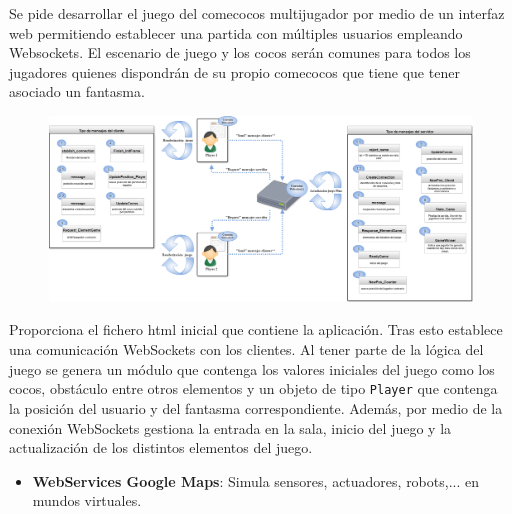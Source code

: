 \documentclass[notes,slidesec,a4]{seminar}
\begin{document}

\begin{hslide}
Se pide desarrollar el juego del comecocos multijugador por medio de un interfaz web permitiendo establecer una partida con múltiples usuarios empleando Websockets. El escenario de juego y los cocos serán comunes para todos los jugadores quienes dispondrán de su propio comecocos que tiene que tener asociado un fantasma.
\end{hslide}

\begin{hslide}

\begin{minipage}{8cm}
\begin{center}
\begin{figure}
\includegraphics[width=12.2cm]{img/Esquema_Pacman_Multijugador.png}
\end{figure}
\end{center}
\end{minipage}
\end{hslide}

\begin{hslide}
Proporciona el fichero html inicial que contiene la aplicación. Tras esto establece una comunicación WebSockets con los clientes. Al tener parte de la lógica del juego se genera un módulo que contenga los valores iniciales del juego como los cocos, obstáculo entre otros elementos y un objeto de tipo \texttt{Player} que contenga la posición del usuario y del fantasma correspondiente. Además,  por medio de la conexión WebSockets gestiona la entrada en la sala, inicio del juego y la actualización de los distintos elementos del juego.
\begin{itemize}
\item \textbf{WebServices Google Maps}: Simula sensores, actuadores, robots,... en mundos virtuales.
\end{itemize}
\end{hslide}
\end{document}
